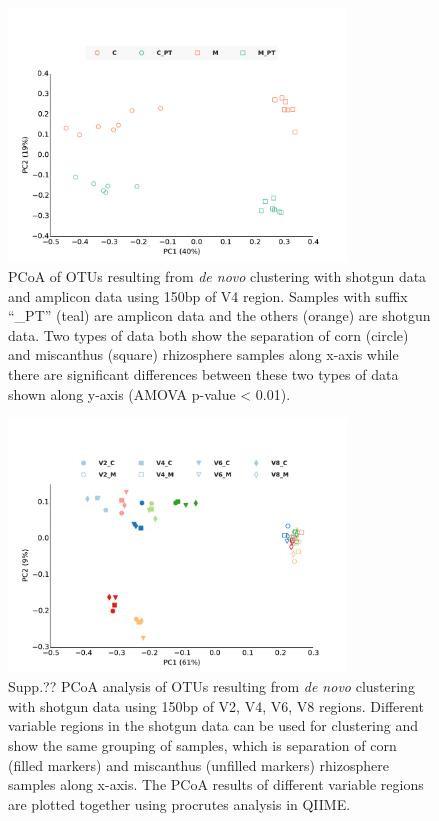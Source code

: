\documentclass[12pt]{article}
\begin{document}
\begin{figure}[tbph!]
  \centering
  \includegraphics[width=0.8\textwidth]{figs/V4_SGvsPT_pcoa}
  \caption[PCoA of OTUs resulting from {\em de novo} clustering with shotgun data and amplicon data using 150bp of V4 region]{PCoA of OTUs resulting from {\em de novo} clustering with shotgun data and amplicon data using 150bp of V4 region. Samples with suffix ``\_PT'' (teal) are amplicon data and the others (orange) are shotgun data. Two types of data both show the separation of corn (circle) and miscanthus (square) rhizosphere samples along x-axis while there are significant differences between these two types of data shown along y-axis (AMOVA p-value < 0.01).}
  \label{fig:V4_SGvsPT_pcoa}
\end{figure}

\begin{figure}[tbph!]
  \centering
  \includegraphics[width=0.8\textwidth]{figs/compare_vregion_color_1leg}
  \caption[PCoA analysis of OTUs resulting from {\em de novo} clustering with shotgun data using 150bp of V2, V4, V6, V8 regions]{Supp.?? PCoA analysis of OTUs resulting from {\em de novo} clustering with shotgun data using 150bp of V2, V4, V6, V8 regions. Different variable regions in the shotgun data can be used for clustering and show the same grouping of samples, which is separation of corn (filled markers) and miscanthus (unfilled markers) rhizosphere samples along x-axis. The PCoA results of different variable regions are plotted together using procrutes analysis in QIIME.}
  \label{fig:compare_vregion}
\end{figure}
\end{document}
